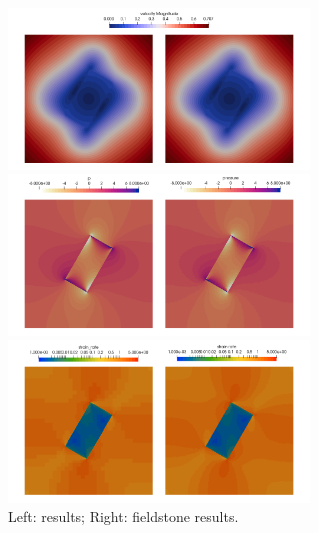 \begin{center}
\includegraphics[width=8cm]{python_codes/fieldstone_142/results/case1/aspect/vel}\\
\includegraphics[width=8cm]{python_codes/fieldstone_142/results/case1/aspect/press}\\
\includegraphics[width=8cm]{python_codes/fieldstone_142/results/case1/aspect/sr}\\
{\captionfont Left: \aspect results; Right: fieldstone results.}
\end{center}



